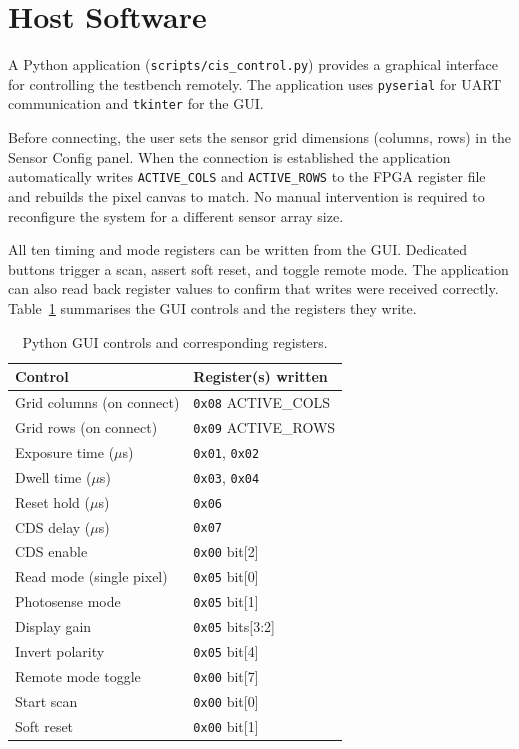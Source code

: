 \section{Host Software}

A Python application (\texttt{scripts/cis\_control.py}) provides a graphical interface for controlling the testbench remotely. The application uses \texttt{pyserial} for UART communication and \texttt{tkinter} for the GUI.

Before connecting, the user sets the sensor grid dimensions (columns, rows) in the Sensor Config panel. When the connection is established the application automatically writes \texttt{ACTIVE\_COLS} and \texttt{ACTIVE\_ROWS} to the FPGA register file and rebuilds the pixel canvas to match. No manual intervention is required to reconfigure the system for a different sensor array size.

All ten timing and mode registers can be written from the GUI. Dedicated buttons trigger a scan, assert soft reset, and toggle remote mode. The application can also read back register values to confirm that writes were received correctly. Table~\ref{tab:gui_controls} summarises the GUI controls and the registers they write.

\begin{table}[h]
\centering
\caption{Python GUI controls and corresponding registers.}
\label{tab:gui_controls}
\begin{tabular}{ll}
\hline
\textbf{Control} & \textbf{Register(s) written} \\
\hline
Grid columns (on connect)  & \texttt{0x08} ACTIVE\_COLS \\
Grid rows (on connect)     & \texttt{0x09} ACTIVE\_ROWS \\
Exposure time ($\mu$s)     & \texttt{0x01}, \texttt{0x02} \\
Dwell time ($\mu$s)        & \texttt{0x03}, \texttt{0x04} \\
Reset hold ($\mu$s)        & \texttt{0x06} \\
CDS delay ($\mu$s)         & \texttt{0x07} \\
CDS enable                 & \texttt{0x00} bit[2] \\
Read mode (single pixel)   & \texttt{0x05} bit[0] \\
Photosense mode            & \texttt{0x05} bit[1] \\
Display gain               & \texttt{0x05} bits[3:2] \\
Invert polarity            & \texttt{0x05} bit[4] \\
Remote mode toggle         & \texttt{0x00} bit[7] \\
Start scan                 & \texttt{0x00} bit[0] \\
Soft reset                 & \texttt{0x00} bit[1] \\
\hline
\end{tabular}
\end{table}
